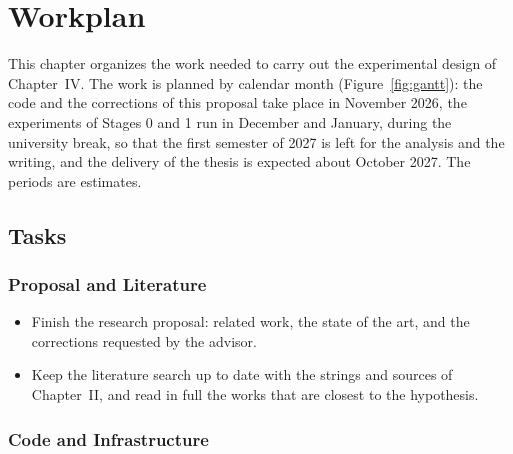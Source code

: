 \renewcommand{\baselinestretch}{1.5}

\chapter{Workplan}

This chapter organizes the work needed to carry out the experimental design of Chapter~IV. The work is planned by calendar month (Figure~\ref{fig:gantt}): the code and the corrections of this proposal take place in November 2026, the experiments of Stages 0 and 1 run in December and January, during the university break, so that the first semester of 2027 is left for the analysis and the writing, and the delivery of the thesis is expected about October 2027. The periods are estimates.

\section{Tasks}

\subsection{Proposal and Literature}

\begin{itemize}
  \item Finish the research proposal: related work, the state of the art, and the corrections requested by the advisor.
  \item Keep the literature search up to date with the strings and sources of Chapter~II, and read in full the works that are closest to the hypothesis.
\end{itemize}

\subsection{Code and Infrastructure}

